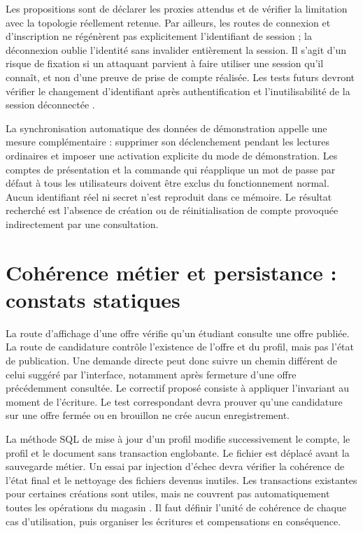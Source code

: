 Les propositions sont de déclarer les proxies attendus et de vérifier la limitation avec la topologie réellement retenue. Par ailleurs, les routes de connexion et d'inscription ne régénèrent pas explicitement l'identifiant de session ; la déconnexion oublie l'identité sans invalider entièrement la session. Il s'agit d'un risque de fixation si un attaquant parvient à faire utiliser une session qu'il connaît, et non d'une preuve de prise de compte réalisée. Les tests futurs devront vérifier le changement d'identifiant après authentification et l'inutilisabilité de la session déconnectée \cite{owasp-session}.

La synchronisation automatique des données de démonstration appelle une mesure complémentaire : supprimer son déclenchement pendant les lectures ordinaires et imposer une activation explicite du mode de démonstration. Les comptes de présentation et la commande qui réapplique un mot de passe par défaut à tous les utilisateurs doivent être exclus du fonctionnement normal. Aucun identifiant réel ni secret n'est reproduit dans ce mémoire. Le résultat recherché est l'absence de création ou de réinitialisation de compte provoquée indirectement par une consultation.

\section{Cohérence métier et persistance : constats statiques}

La route d'affichage d'une offre vérifie qu'un étudiant consulte une offre publiée. La route de candidature contrôle l'existence de l'offre et du profil, mais pas l'état de publication. Une demande directe peut donc suivre un chemin différent de celui suggéré par l'interface, notamment après fermeture d'une offre précédemment consultée. Le correctif proposé consiste à appliquer l'invariant au moment de l'écriture. Le test correspondant devra prouver qu'une candidature sur une offre fermée ou en brouillon ne crée aucun enregistrement.

La méthode SQL de mise à jour d'un profil modifie successivement le compte, le profil et le document sans transaction englobante. Le fichier est déplacé avant la sauvegarde métier. Un essai par injection d'échec devra vérifier la cohérence de l'état final et le nettoyage des fichiers devenus inutiles. Les transactions existantes pour certaines créations sont utiles, mais ne couvrent pas automatiquement toutes les opérations du magasin \cite{laravel-database}. Il faut définir l'unité de cohérence de chaque cas d'utilisation, puis organiser les écritures et compensations en conséquence.

